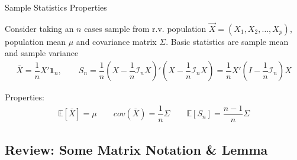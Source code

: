 \begin{point}
    \hypertarget{SampleStatisticsProperties}{Sample Statistics Properties}
\end{point}

    Consider taking an $ n $ cases sample from r.v. population $ \vec{X}=(X_1,X_2,\ldots,X_p) $, population mean $ \mu $ and covariance matrix $ \Sigma  $. Basic statistics are sample mean and sample variance
    \begin{align}
        \bar{X}=\dfrac{1}{n}X'\mathbf{1}_n, \qquad  S_n=\dfrac{1}{n}\left(X-\dfrac{1}{n}\mathcal{I}_nX\right)'\left(X-\dfrac{1}{n}\mathcal{I}_nX\right)=\dfrac{1}{n}X'\left(I-\dfrac{1}{n}\mathcal{I}_n\right)X
    \end{align}

    Properties:
\begin{align}
     \mathbb{E}\left[ \bar{X} \right] = \mu \qquad cov(\bar{X})=\dfrac{1}{n}\Sigma \qquad \mathbb{E}\left[ S_n \right] = \dfrac{n-1}{n}\Sigma 
\end{align}


    
        


\subsection{Review: Some Matrix Notation \& Lemma}\label{SubSubSectionMatrixNotationAndLemma}

